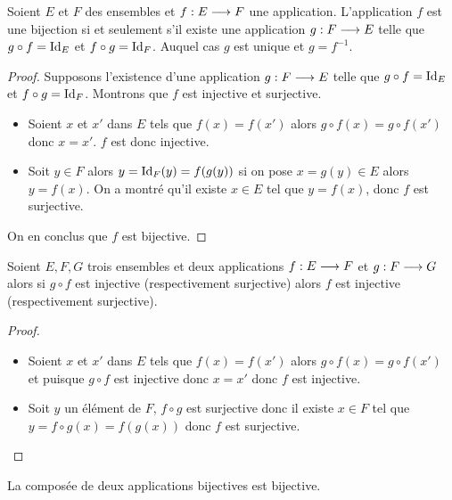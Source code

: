 \begin{theo}
  Soient \(E\) et \(F\) des ensembles et \(f:E \longrightarrow F\) une 
  application. L'application \(f\) est une bijection si et seulement s'il 
  existe une application \(g:F \longrightarrow E\) telle que \(g \circ f = 
  \operatorname{Id}_E\) et \(f \circ g = \operatorname{Id}_F\). Auquel cas \(g\) est unique et 
  \(g = f^{-1}\).
\end{theo}

\begin{proof}
  Supposons l'existence d'une application \(g:F \longrightarrow E\) telle que 
  \(g \circ f = \operatorname{Id}_E\) et \(f \circ g = \operatorname{Id}_F\). Montrons que \(f\) est 
  injective et surjective.
  \begin{itemize}
    \item Soient \(x\) et \(x'\) dans \(E\) tels que \(f(x) = f(x')\) alors 
      \(g \circ f(x) = g \circ f(x')\) donc \(x = x'\). \(f\) est donc 
      injective.
    \item Soit \(y \in F\) alors \(y = \operatorname{Id}_F(y) = f(g(y))\) si on pose \(x = g(y) 
      \in E\) alors \(y = f(x)\). On a montré qu'il existe \(x \in E\) tel 
      que \(y = f(x)\), donc \(f\) est surjective.
  \end{itemize}
  On en conclus que \(f\) est bijective.
\end{proof}

\begin{prop}
  Soient \(E, F, G\) trois ensembles et deux applications 
  \(f:E \longrightarrow F\) et \(g:F \longrightarrow G\) alors si \(g \circ f\) 
  est injective (respectivement surjective) alors \(f\) est injective 
  (respectivement surjective).
\end{prop}

\begin{proof}
  \begin{itemize}
    \item Soient \(x\) et \(x'\) dans \(E\) tels que \(f(x) = f(x')\) alors 
      \(g \circ f(x) = g \circ f(x')\) et puisque \(g \circ f\) est 
      injective donc \(x = x'\) donc \(f\) est injective.
    \item Soit \(y\) un élément de \(F\), \(f \circ g\) est surjective donc 
      il existe \(x \in F\) tel que \(y = f \circ g(x) = f(g(x))\) donc 
      \(f\) est surjective.
  \end{itemize}
\end{proof}

\begin{prop}
  La composée de deux applications bijectives est bijective.
\end{prop}

